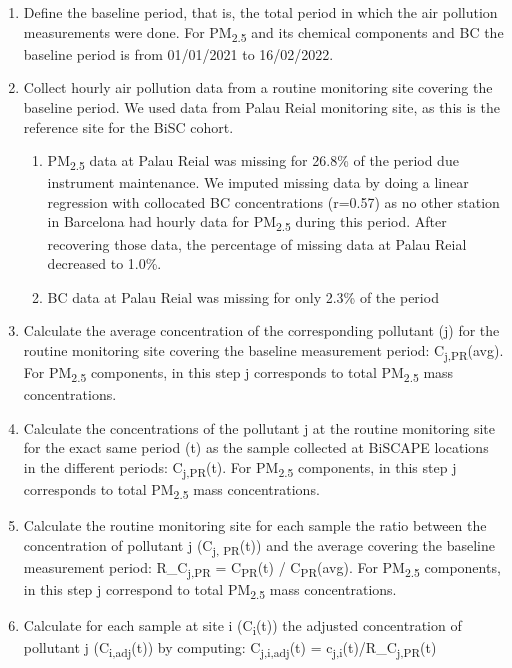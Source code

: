 \documentclass{article}
\begin{document}
\begin{enumerate}
  \item Define the baseline period, that is, the total period in which the air pollution measurements were done. For PM\textsubscript{2.5} and its chemical components and BC the baseline period is from 01/01/2021 to 16/02/2022. 
  \item Collect hourly air pollution data from a routine monitoring site covering the baseline period. We used data from Palau Reial monitoring site, as this is the reference site for the BiSC cohort. 
  \begin{enumerate}
      \item PM\textsubscript{2.5} data at Palau Reial was missing for 26.8\% of the period due instrument maintenance. We imputed missing data by doing a linear regression with collocated BC concentrations (r=0.57) as no other station in Barcelona had hourly data for PM\textsubscript{2.5} during this period. After recovering those data, the percentage of missing data at Palau Reial decreased to 1.0\%. 
      \item BC data at Palau Reial was missing for only 2.3\% of the period
  \end{enumerate}
 \item Calculate the average concentration of the corresponding pollutant (j) for the routine monitoring site covering the baseline measurement period: C\textsubscript{j,PR}(avg). For PM\textsubscript{2.5} components, in this step j corresponds to total PM\textsubscript{2.5} mass concentrations.
 \item Calculate the concentrations of the pollutant j at the routine monitoring site for the exact same period (t) as the sample collected at BiSCAPE locations in the different periods: C\textsubscript{j,PR}(t). For PM\textsubscript{2.5} components, in this step j corresponds to total PM\textsubscript{2.5} mass concentrations. 
 \item Calculate the routine monitoring site for each sample the ratio between the concentration of pollutant j (C\textsubscript{j, PR}(t)) and the average covering the baseline measurement period: R\_C\textsubscript{j,PR} = C\textsubscript{PR}(t) / C\textsubscript{PR}(avg). For PM\textsubscript{2.5} components, in this step j correspond to total PM\textsubscript{2.5} mass concentrations.
 \item Calculate for each sample at site i (C\textsubscript{i}(t)) the adjusted concentration of pollutant j (C\textsubscript{i,adj}(t)) by computing: C\textsubscript{j,i,adj}(t) = c\textsubscript{j,i}(t)/R\_C\textsubscript{j,PR}(t)
\end{enumerate}
\end{document}
